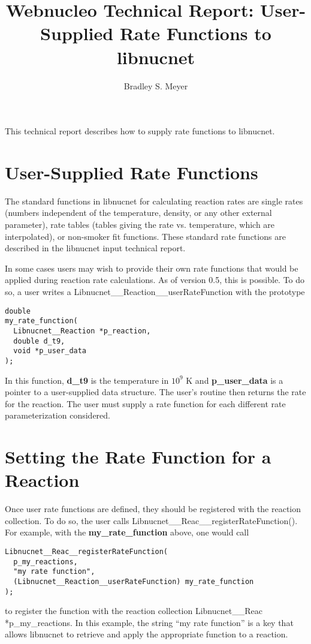 \documentclass{article}    %
\title{Webnucleo Technical Report: User-Supplied Rate Functions to libnucnet }
\author{Bradley S. Meyer}
\begin{document}

\maketitle                 %


This technical report describes how to supply rate functions to libnucnet.

\section{User-Supplied Rate Functions}  \label{sec:user_rate_function}

The standard functions in libnucnet for calculating reaction rates are
single rates (numbers independent of the temperature, density, or any other
external parameter), rate tables (tables giving the rate vs. temperature,
which are interpolated), or non-smoker fit functions.  These standard
rate functions are described in the libnucnet input technical report.

In some cases users may wish to provide their own rate functions that
would be applied during reaction rate calculations.  As of version 0.5,
this is possible.  To do so, a user writes a
Libnucnet\_\_Reaction\_\_userRateFunction with the prototype
\begin{verbatim}
double
my_rate_function(
  Libnucnet__Reaction *p_reaction,
  double d_t9,
  void *p_user_data
);
\end{verbatim}
In this function, {\bf d\_t9} is the temperature in $10^9$ K and {\bf
p\_user\_data} is a pointer to a user-supplied data structure.  The user's
routine then returns the rate for the reaction.  The user must supply a
rate function for each different rate parameterization considered.

\section{Setting the Rate Function for a Reaction}

Once user rate functions are defined, they should be registered with
the reaction collection.  To do so, the user calls
Libnucnet\_\_Reac\_\_registerRateFunction().  For example, with the
{\bf my\_rate\_function} above, one would call
\begin{verbatim}
Libnucnet__Reac__registerRateFunction(
  p_my_reactions,
  "my rate function",
  (Libnucnet__Reaction__userRateFunction) my_rate_function
);
\end{verbatim} 
to register the function with the reaction collection
Libnucnet\_\_Reac *p\_my\_reactions.  In this example, the string
``my rate function'' is a key that allows libnucnet to retrieve and
apply the appropriate function to a reaction.
\end{document}
